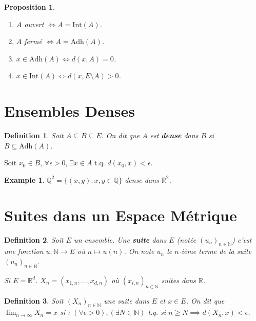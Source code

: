\documentclass{article}
\newtheorem{proposition}{Proposition}
\newtheorem{definition}{Definition}
\newtheorem{example}{Example}
\begin{document}
\begin{proposition}
\begin{enumerate}
    \item $A$ ouvert $\iff A = \text{Int}(A)$.
    \item $A$ fermé $\iff A = \text{Adh}(A)$.
    \item $x \in \text{Adh}(A) \iff d(x, A) = 0$.
    \item $x \in \text{Int}(A) \iff d(x, E \setminus A) > 0$.
\end{enumerate}
\end{proposition}

\section{Ensembles Denses}

\begin{definition}
Soit $A \subseteq B \subseteq E$. On dit que $A$ est \textbf{dense} dans $B$ si $B \subseteq \text{Adh}(A)$.
\end{definition}

Soit $x_0 \in B$, $\forall \epsilon > 0$, $\exists x \in A$ t.q. $d(x_0, x) < \epsilon$.

\begin{example}
$\mathbb{Q}^2 = \{(x, y) : x, y \in \mathbb{Q}\}$ dense dans $\mathbb{R}^2$.
\end{example}


\section{Suites dans un Espace Métrique}

\begin{definition}
Soit $E$ un ensemble. Une \textbf{suite} dans $E$ (notée $(u_n)_{n \in \mathbb{N}}$) c'est une fonction $u : \mathbb{N} \to E$ où $n \mapsto u(n)$.
On note $u_n$ le $n$-ième terme de la suite $(u_n)_{n \in \mathbb{N}}$.

Si $E = \mathbb{R}^d$.
$X_n = (x_{1,n}, \dots, x_{d,n})$ où $(x_{i,n})_{n \in \mathbb{N}}$ suites dans $\mathbb{R}$.
\end{definition}

\begin{definition}
Soit $(X_n)_{n \in \mathbb{N}}$ une suite dans $E$ et $x \in E$. On dit que $\lim_{n \to \infty} X_n = x$ si :
$(\forall \epsilon > 0), (\exists N \in \mathbb{N})$ t.q. si $n \geq N \implies d(X_n, x) < \epsilon$.
\end{definition}
\end{document}

